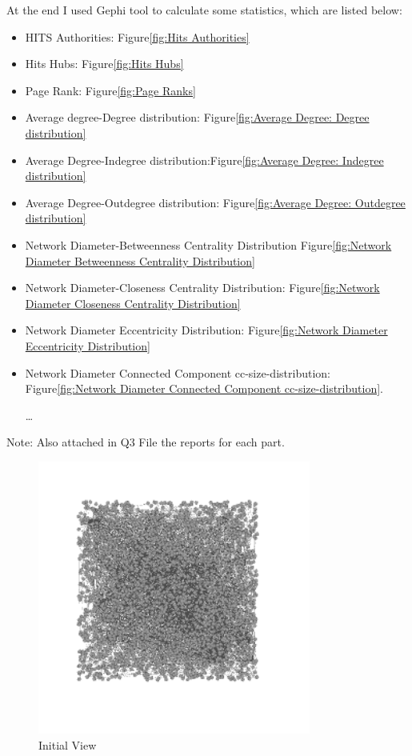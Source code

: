 \documentclass[letterpaper,11pt]{article}
\begin{document}
At the end I used Gephi tool to calculate some statistics, which are listed below:
\begin{itemize}
\item HITS Authorities: Figure\ref{fig:Hits Authorities}
\item Hits Hubs: Figure\ref{fig:Hits Hubs}
\item Page Rank: Figure\ref{fig:Page Ranks}
\item Average degree-Degree distribution: Figure\ref{fig:Average Degree: Degree distribution}
\item Average Degree-Indegree distribution:Figure\ref{fig:Average Degree: Indegree distribution}
\item Average Degree-Outdegree distribution: Figure\ref{fig:Average Degree: Outdegree distribution}
\item Network Diameter-Betweenness Centrality Distribution Figure\ref{fig:Network Diameter Betweenness Centrality Distribution}
\item Network Diameter-Closeness Centrality Distribution: Figure\ref{fig:Network Diameter Closeness Centrality Distribution}
\item Network Diameter Eccentricity Distribution: Figure\ref{fig:Network Diameter Eccentricity Distribution} 
\item Network Diameter Connected Component cc-size-distribution: Figure\ref{fig:Network Diameter Connected Component cc-size-distribution}.

\ldots
\end{itemize}

Note: Also attached in Q3 File the reports for each part.  

\begin{figure}[!ht]
\centering
\includegraphics[width=0.8\textwidth]{Q3/1.png}
\caption{Initial View}
\label{fig:Initial View}
\end{figure}
\end{document}

